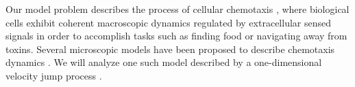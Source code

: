 \documentclass[preprint]{elsarticle}
\begin{document}
%

%
%

Our model problem describes the process of cellular chemotaxis \cite{othmer2000diffusion}, where biological cells exhibit coherent macroscopic dynamics regulated by extracellular sensed signals in order to accomplish tasks such as finding food or navigating away from toxins.
%
Several microscopic models have been proposed to describe chemotaxis dynamics \cite{othmer1988models, codling2008random}.
%
We will analyze one such model described by a one-dimensional velocity jump process \cite{othmer2000diffusion}.
%
%
%
%
%
%
%
%
%
\end{document}
